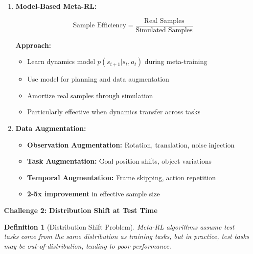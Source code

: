 \documentclass[12pt]{article}
\newcommand{\ieee}[1]{\textcolor{IEEEBlue}{\textbf{#1}}}
\newtheorem{definition}{Definition}
\begin{document}
{{\begin{enumerate}
				\textbf{Benefits:}
				\begin{itemize}
					\item 10-100x improvement in sample efficiency
					\item Can reuse data across meta-iterations
					\item Better suited for real-world applications
					\item Enables continuous learning
				\end{itemize}
				
				\item \textbf{Model-Based Meta-RL:}
				
				\begin{equation}
				\text{Sample Efficiency} = \frac{\text{Real Samples}}{\text{Simulated Samples}}
				\end{equation}
				
				\textbf{Approach:}
				\begin{itemize}
					\item Learn dynamics model $p(s_{t+1}|s_t, a_t)$ during meta-training
					\item Use model for planning and data augmentation
					\item Amortize real samples through simulation
					\item Particularly effective when dynamics transfer across tasks
				\end{itemize}
				
				\item \textbf{Data Augmentation:}
				
				\begin{itemize}
					\item \textbf{Observation Augmentation:} Rotation, translation, noise injection
					\item \textbf{Task Augmentation:} Goal position shifts, object variations
					\item \textbf{Temporal Augmentation:} Frame skipping, action repetition
					\item \textbf{2-5x improvement} in effective sample size
				\end{itemize}
			\end{enumerate}
			
			\ieee{Challenge 2: Distribution Shift at Test Time}
			
			\begin{definition}[Distribution Shift Problem]
			Meta-RL algorithms assume test tasks come from the same distribution as training tasks, but in practice, test tasks may be out-of-distribution, leading to poor performance.
			\end{definition}
			
}}
\end{document}
